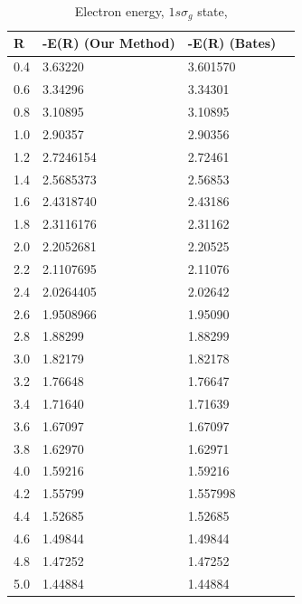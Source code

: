  \begin{table}[ht]
    \caption{Electron energy, $ 1s\sigma_g $ state, \label{groundEven}}
  \centering
  \label{tab:UsVsBates1s}
    \begin{tabular}{ m{4em} m{4em}  m{4em}  m{4em} }
      \hline
      R & -E(R) (Our Method) & -E(R) (Bates)  \\ \hline \hline
      0.4 & 3.63220 & 3.601570 \\
      0.6 & 3.34296 & 3.34301 \\
      0.8 & 3.10895 & 3.10895 \\
      1.0 & 2.90357 & 2.90356 \\
      1.2 & 2.7246154 & 2.72461 \\
      1.4 & 2.5685373 & 2.56853 \\
      1.6 & 2.4318740 & 2.43186 \\
      1.8 & 2.3116176 & 2.31162 \\
      2.0 & 2.2052681 & 2.20525 \\
      2.2 & 2.1107695 & 2.11076 \\ 
      2.4 & 2.0264405 & 2.02642 \\
      2.6 & 1.9508966 & 1.95090 \\
      2.8 & 1.88299 & 1.88299 \\
      3.0 & 1.82179 & 1.82178 \\
      3.2 & 1.76648 & 1.76647 \\
      3.4 & 1.71640 & 1.71639 \\
      3.6 & 1.67097 & 1.67097  \\
      3.8 & 1.62970 & 1.62971  \\
      4.0 & 1.59216 & 1.59216  \\
      4.2 & 1.55799 & 1.557998 \\
      4.4 & 1.52685 & 1.52685 \\
      4.6 & 1.49844 & 1.49844 \\
      4.8 & 1.47252 & 1.47252 \\
      5.0 & 1.44884 & 1.44884 \\
      \hline
    \end{tabular}
  \end{table}

